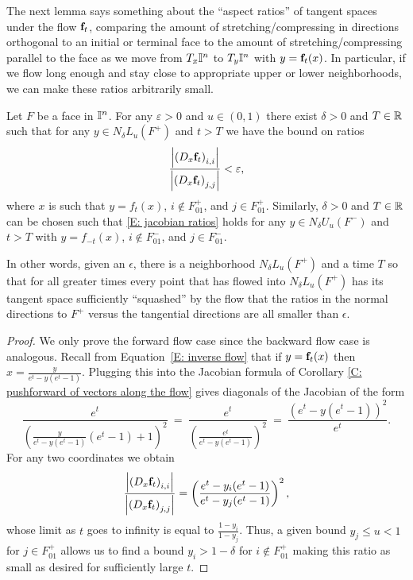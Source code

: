 The next lemma says something about the ``aspect ratios'' of tangent spaces under the flow $\mathbf{f}_t$, comparing the amount of stretching/compressing in directions orthogonal to an initial or terminal face to the amount of stretching/compressing parallel to the face as we move from $T_x\mathbb{I}^n$ to $T_{y}\mathbb{I}^n$ with $y=\mathbf{f}_t(x)$. In particular, if we flow long enough and stay close to appropriate upper or lower neighborhoods, we can make these ratios arbitrarily small. 

\begin{lemma} \label{L: jacobian ratios}
	Let $F$ be a face in $\mathbb{I}^n$. For any $\varepsilon > 0$ and $u \in (0,1)$ there exist $\delta > 0$ and $T\in \mathbb{R}$ such that for any $y \in N_\delta L_u(F^+)$ and $t>T$ we have the bound on ratios
	\begin{equation} \label{E: jacobian ratios}
	\frac{\left|\left(D_{x}\mathbf{f}_t\right)_{i,i}\right|}
	{\left|\left(D_{x}\mathbf{f}_t\right)_{j,j}\right|} < \varepsilon,
	\end{equation}
	where $x$ is such that $y = f_t(x)$, $i \not\in F^+_{01}$, and $j \in F^+_{01}$. Similarly, $\delta > 0$ and $T\in \mathbb{R}$ can be chosen such that \eqref{E: jacobian ratios} holds for any $y \in N_\delta U_u(F^-)$ and $t>T$ with $y = f_{-t}(x)$, $i \not\in F^-_{01}$, and $j \in F^-_{01}$.
\end{lemma}
In other words, given an $\epsilon$, there is a neighborhood $N_\delta L_u(F^+)$ and a time $T$ so that for all greater times every point that has flowed into $N_\delta L_u(F^+)$ has its tangent space sufficiently ``squashed'' by the flow that the ratios in the normal directions to $F^+$ versus the tangential directions are all smaller than $\epsilon$. 

\begin{proof}
	We only prove the forward flow case since the backward flow case is analogous.
	Recall from Equation~\eqref{E: inverse flow} that if $y = \mathbf{f}_t(x)$ then $x = \frac{y}{e^t-y(e^t-1)}$. 
	Plugging this into the Jacobian formula of Corollary \ref{C: pushforward of vectors along the flow} gives diagonals of the Jacobian of the form
	\begin{equation*}
	\frac{e^t}{\left(\frac{y}{e^t-y(e^t-1)}(e^t -1) + 1\right)^2} \ = \
	\frac{e^t}{\left(\frac{e^t}{e^t-y(e^t-1)}\right)^2} \ = \
	\frac{\left(e^t-y(e^t-1)\right)^2}{e^t}.
	\end{equation*}
	For any two coordinates we obtain 
	\begin{equation*}
	\frac{\left|\left(D_{x}\mathbf{f}_t\right)_{i,i}\right|}
	{\left|\left(D_{x}\mathbf{f}_t\right)_{j,j}\right|} = \left(\frac{e^t-y_i(e^t-1)}{e^t-y_j(e^t-1)}\right)^2,
	\end{equation*}
	whose limit as $t$ goes to infinity is equal to $\frac{1-y_i}{1-y_j}$. 
	Thus, a given bound $y_j \leq u<1$ for $j \in F^+_{01}$ allows us to find a bound $y_i > 1- \delta$ for $i \not\in F^+_{01}$ making this ratio as small as desired for sufficiently large $t$.
\end{proof}


